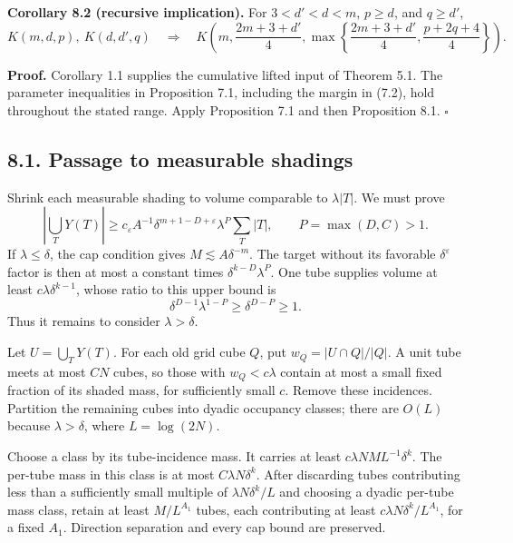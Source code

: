 \documentclass[
  11pt,
  a4paper,
]{article}
\begin{document}
\textbf{Corollary 8.2 (recursive implication).} For \(3<d'<d<m\),
\(p\ge d\), and \(q\ge d'\), \[
 K(m,d,p),\ K(d,d',q)
 \quad\Longrightarrow\quad
 K\left(m,\frac{2m+3+d'}4,
 \max\left\{\frac{2m+3+d'}4,\frac{p+2q+4}4\right\}\right).
                                                               \tag{8.2}\label{eq:8.2}
\]

\textbf{Proof.} Corollary 1.1 supplies the cumulative lifted input of
Theorem 5.1. The parameter inequalities in Proposition 7.1, including
the margin in (7.2), hold throughout the stated range. Apply Proposition
7.1 and then Proposition 8.1. \(\square\)

\hypertarget{passage-to-measurable-shadings}{%
\subsection{8.1. Passage to measurable
shadings}\label{passage-to-measurable-shadings}}

Shrink each measurable shading to volume comparable to \(\lambda|T|\).
We must prove \[
 \left|\bigcup_TY(T)\right|
 \ge c_\varepsilon A^{-1}\delta^{m+1-D+\varepsilon}
              \lambda^P\sum_T|T|,
 \qquad P=\max(D,C)>1.
\] If \(\lambda\le\delta\), the cap condition gives
\(M\lesssim A\delta^{-m}\). The target without its favorable
\(\delta^\varepsilon\) factor is then at most a constant times
\(\delta^{k-D}\lambda^P\). One tube supplies volume at least
\(c\lambda\delta^{k-1}\), whose ratio to this upper bound is \[
 \delta^{D-1}\lambda^{1-P}
 \ge\delta^{D-P}\ge1.
\] Thus it remains to consider \(\lambda>\delta\).

Let \(U=\bigcup_TY(T)\). For each old grid cube \(Q\), put
\(w_Q=|U\cap Q|/|Q|\). A unit tube meets at most \(CN\) cubes, so those
with \(w_Q<c\lambda\) contain at most a small fixed fraction of its
shaded mass, for sufficiently small \(c\). Remove these incidences.
Partition the remaining cubes into dyadic occupancy classes; there are
\(O(L)\) because \(\lambda>\delta\), where \(L=\log(2N)\).

Choose a class by its tube-incidence mass. It carries at least
\(c\lambda NML^{-1}\delta^k\). The per-tube mass in this class is at
most \(C\lambda N\delta^k\). After discarding tubes contributing less
than a sufficiently small multiple of \(\lambda N\delta^k/L\) and
choosing a dyadic per-tube mass class, retain at least \(M/L^{A_1}\)
tubes, each contributing at least \(c\lambda N\delta^k/L^{A_1}\), for a
fixed \(A_1\). Direction separation and every cap bound are preserved.
\end{document}

